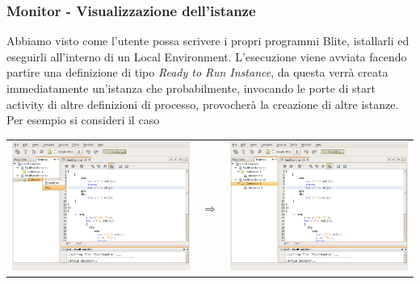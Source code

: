 \subsubsection*{Monitor - Visualizzazione dell'istanze}

Abbiamo visto come l'utente possa scrivere i propri programmi Blite, istallarli
ed eseguirli all'interno di un Local Environment. L'esecuzione viene avviata
facendo partire una definizione di tipo \emph{Ready to Run Instance}, da
questa verrà creata immediatamente un'istanza che probabilmente, invocando le
porte di start activity di altre definizioni di processo, provocherà la
creazione di altre istanze. Per esempio si consideri il caso

\vspace{0.5cm}
\begin{center}
\begin{tabular}{ccc}
\includegraphics[scale=0.75]{blide/dia/BlideMon1} 
& $\Rightarrow$
& \includegraphics[scale=0.75]{blide/dia/BlideMon2}    
\end{tabular}
\end{center}
\vspace{0.5cm}

